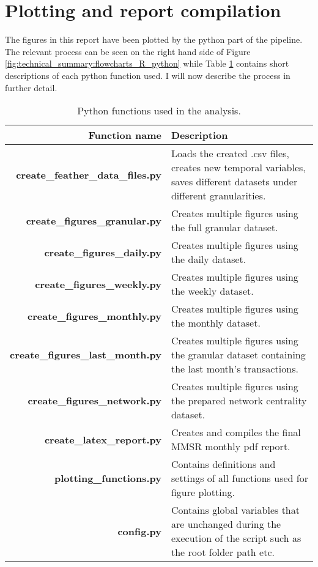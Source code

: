 \section{Plotting and report compilation}

The figures in this report have been plotted by the python part of the pipeline. The relevant process can be seen on the right hand side of Figure \ref{fig:technical_summary:flowcharts_R_python} while Table \ref{tab:technical_summary:used_functions_python} contains short descriptions of each python function used. I will now describe the process in further detail.


\begin{table}[h]
	\centering
	\begin{tabularx}{0.9\linewidth}{rX}
		Function name & Description \\
		\toprule
		\textbf{create\_feather\_data\_files.py} & Loads the created .csv files, creates new temporal variables, saves different datasets under different granularities. \\
		\textbf{create\_figures\_granular.py} & Creates multiple figures using the full granular dataset.  \\
		\textbf{create\_figures\_daily.py} & Creates multiple figures using the daily dataset.\\
		\textbf{create\_figures\_weekly.py} & Creates multiple figures using the weekly dataset.\\
		\textbf{create\_figures\_monthly.py} & Creates multiple figures using the monthly dataset.\\
		\textbf{create\_figures\_last\_month.py} & Creates multiple figures using the granular dataset containing the last month's transactions.\\
		\textbf{create\_figures\_network.py} & Creates multiple figures using the prepared network centrality dataset.\\
		\textbf{create\_latex\_report.py} & Creates and compiles the final MMSR monthly pdf report.\\
		\textbf{plotting\_functions.py} & Contains definitions and settings of all functions used for figure plotting. \\
		\textbf{config.py} & Contains global variables that are unchanged during the execution of the script such as the root folder path etc.\\
		\bottomrule
	\end{tabularx}
	\caption{Python functions used in the analysis.}
	\label{tab:technical_summary:used_functions_python}
\end{table}


